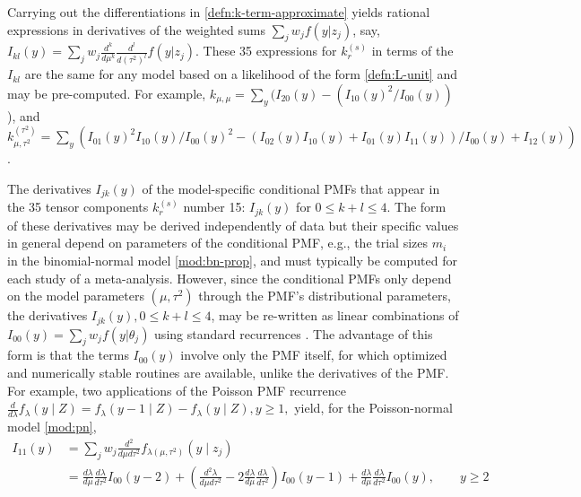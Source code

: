 \documentclass[12pt]{article}
\newcommand{\F}{I}
\newcommand{\Z}{Z}
\newcommand{\z}{z}
\newcommand{\y}{y}
\renewcommand{\k}{k}
\newcommand{\kterm}{\k_r^{(s)}}
\newcommand{\w}{w}
\newcommand{\effect}{\mu}
\begin{document}
Carrying out the differentiations in \eqref{defn:k-term-approximate} yields
rational expressions in derivatives of the weighted sums
$\sum_{j} \w_j f(\y|\z_j)$, say,
$\F_{kl}(\y)=\sum_{j} \w_j \frac{d^k}{d\mu^k}\frac{d^l}{d(\tau^2)^l}
f(y|\z_j)$. These 35 expressions for $\kterm$ in terms of the $\F_{kl}$ are
the same for any model based on a likelihood of the form \eqref{defn:L-unit}  and may be pre-computed. For example,
$\k_{\mu,\mu}=
\sum_\y(\F_{20}(\y)-(\F_{10}(\y)^2/\F_{00}(\y))$), %
and $\k_{\mu,\tau^2}^{(\tau^2)}=\sum_\y(\F_{01}(\y)^2\F_{10}(\y)/\F_{00}(\y)^2 - (\F_{02}(\y)\F_{10}(\y) + \F_{01}(\y)\F_{11}(\y))/
\F_{00}(\y) + \F_{12}(\y))$.

The derivatives $\F_{jk}(\y)$ of the model-specific conditional PMFs
that appear in the 35 tensor components $\kterm$ number 15: $\F_{jk}(\y)$ for
$0\le k+l \le 4$. The form of these derivatives may be derived
independently of data but their specific values in general depend on
parameters of the conditional PMF, e.g., the trial sizes $m_i$ in the binomial-normal model \eqref{mod:bn-prop}, and must typically be
computed for each study of a meta-analysis. %
However, since the conditional PMFs only depend on the model
parameters $(\effect,\tau^2)$ through the PMF's distributional
parameters, the derivatives $\F_{jk}(\y), 0\le k+l \le 4$, may be
re-written as linear combinations  of $\F_{00}(\y)=\sum_{j} \w_j f(y|\theta_j)$ using standard
recurrences \citep{johnson:05}. The advantage of this form is that the terms
$\F_{00}(\y)$ involve only the PMF itself, for which optimized and
numerically stable routines are available, unlike the derivatives of the PMF. For example, two
applications of the Poisson PMF recurrence
$ \frac{d}{d\lambda} f_{\lambda}(\y\mid \Z) = f_{\lambda}(\y-1\mid \Z)
- f_{\lambda}(\y\mid \Z), \y\ge 1, $ yield, for the Poisson-normal model \eqref{mod:pn},
\begin{align}
  \F_{11}(\y) &= \sum_j\w_j \frac{d^2}{d\mu d\tau^2} f_{\lambda(\effect,\tau^2)}(\y\mid \z_j)\\
              &= \frac{d\lambda}{d\mu} \frac{d\lambda}{d\tau^2}\F_{00}(\y-2)
                +( \frac{d^2\lambda}{d\mu d\tau^2} - 2 \frac{d\lambda}{d\mu} \frac{d\lambda}{d\tau^2}) \F_{00}(\y-1)
                + \frac{d\lambda}{d\mu} \frac{d\lambda}{d\tau^2} \F_{00}(\y),\qquad \y\ge 2
\end{align}
\end{document}
